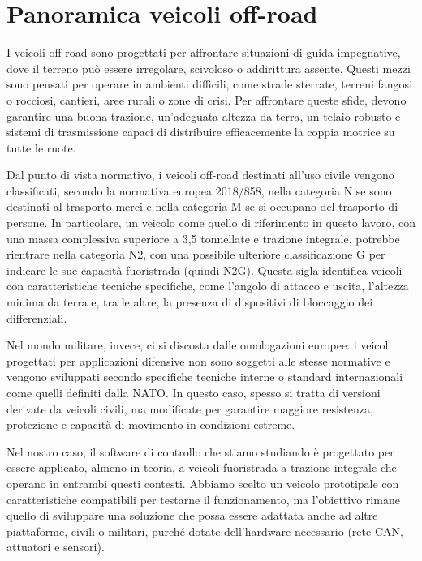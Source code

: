 \documentclass[11pt]{report}
\begin{document}
	\section{Panoramica veicoli off-road }
	
	I veicoli off-road sono progettati per affrontare situazioni di guida impegnative, dove il terreno può essere irregolare, scivoloso o addirittura assente. Questi mezzi sono pensati per operare in ambienti difficili, come strade sterrate, terreni fangosi o rocciosi, cantieri, aree rurali o zone di crisi. Per affrontare queste sfide, devono garantire una buona trazione, un’adeguata altezza da terra, un telaio robusto e sistemi di trasmissione capaci di distribuire efficacemente la coppia motrice su tutte le ruote.
	
	Dal punto di vista normativo, i veicoli off-road destinati all'uso civile vengono classificati, secondo la normativa europea 2018/858, nella categoria N se sono destinati al trasporto merci e nella categoria M se si occupano del trasporto di persone. In particolare, un veicolo come quello di riferimento in questo lavoro, con una massa complessiva superiore a 3,5 tonnellate e trazione integrale, potrebbe rientrare nella categoria N2, con una possibile ulteriore classificazione G per indicare le sue capacità fuoristrada (quindi N2G). Questa sigla identifica veicoli con caratteristiche tecniche specifiche, come l’angolo di attacco e uscita, l’altezza minima da terra e, tra le altre, la presenza di dispositivi di bloccaggio dei differenziali.\cite{REGOLAMENTO(UE)2018/858}
	
	Nel mondo militare, invece, ci si discosta dalle omologazioni europee: i veicoli progettati per applicazioni difensive non sono soggetti alle stesse normative e vengono sviluppati secondo specifiche tecniche interne o standard internazionali come quelli definiti dalla NATO. In questo caso, spesso si tratta di versioni derivate da veicoli civili, ma modificate per garantire maggiore resistenza, protezione e capacità di movimento in condizioni estreme.
	
	Nel nostro caso, il software di controllo che stiamo studiando è progettato per essere applicato, almeno in teoria, a veicoli fuoristrada a trazione integrale che operano in entrambi questi contesti. Abbiamo scelto un veicolo prototipale con caratteristiche compatibili per testarne il funzionamento, ma l’obiettivo rimane quello di sviluppare una soluzione che possa essere adattata anche ad altre piattaforme, civili o militari, purché dotate dell’hardware necessario (rete CAN, attuatori e sensori).
	
\end{document}
